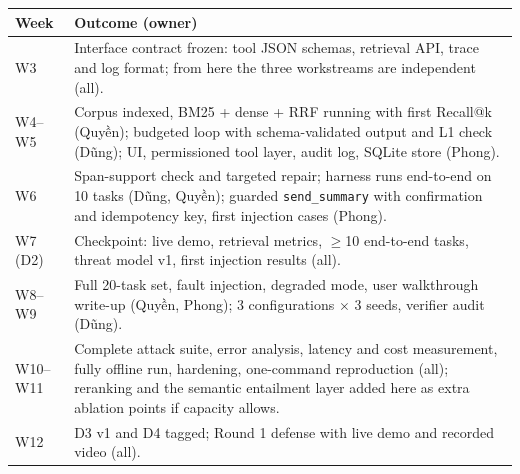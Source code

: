 {\small
\noindent
\begin{tabularx}{\textwidth}{@{} p{1.4cm} X @{}}
\toprule
\textbf{Week} & \textbf{Outcome (owner)} \\
\midrule
W3 & Interface contract frozen: tool JSON schemas, retrieval API, trace and log format; from here the three workstreams are independent (all). \\
W4--W5 & Corpus indexed, BM25 + dense + RRF running with first Recall@k (Quyền); budgeted loop with schema-validated output and L1 check (Dũng); UI, permissioned tool layer, audit log, SQLite store (Phong). \\
W6 & Span-support check and targeted repair; harness runs end-to-end on 10 tasks (Dũng, Quyền); guarded \texttt{send\_summary} with confirmation and idempotency key, first injection cases (Phong). \\
W7 (D2) & Checkpoint: live demo, retrieval metrics, $\geq$10 end-to-end tasks, threat model v1, first injection results (all). \\
W8--W9 & Full 20-task set, fault injection, degraded mode, user walkthrough write-up (Quyền, Phong); 3 configurations $\times$ 3 seeds, verifier audit (Dũng). \\
W10--W11 & Complete attack suite, error analysis, latency and cost measurement, fully offline run, hardening, one-command reproduction (all); reranking and the semantic entailment layer added here as extra ablation points if capacity allows. \\
W12 & D3 v1 and D4 tagged; Round 1 defense with live demo and recorded video (all). \\
\bottomrule
\end{tabularx}
}

